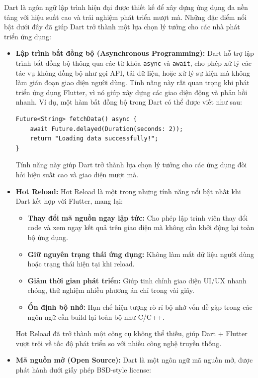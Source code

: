 \documentclass[../DoAn.tex]{subfiles}
\numberwithin{figure}{chapter}
\begin{document}
Dart là ngôn ngữ lập trình hiện đại được thiết kế để xây dựng ứng dụng đa nền tảng với hiệu suất cao và trải nghiệm phát triển mượt mà. Những đặc điểm nổi bật dưới đây đã giúp Dart trở thành một lựa chọn lý tưởng cho các nhà phát triển ứng dụng:

\begin{itemize}
\item \textbf{Lập trình bất đồng bộ (Asynchronous Programming):} 
Dart hỗ trợ lập trình bất đồng bộ thông qua các từ khóa \texttt{async} và \texttt{await}, cho phép xử lý các tác vụ không đồng bộ như gọi API, tải dữ liệu, hoặc xử lý sự kiện mà không làm gián đoạn giao diện người dùng. Tính năng này rất quan trọng khi phát triển ứng dụng Flutter, vì nó giúp xây dựng các giao diện động và phản hồi nhanh. Ví dụ, một hàm bất đồng bộ trong Dart có thể được viết như sau:
    
\begin{lstlisting}
Future<String> fetchData() async {
    await Future.delayed(Duration(seconds: 2));
    return "Loading data successfully!";
}
\end{lstlisting}
    
Tính năng này giúp Dart trở thành lựa chọn lý tưởng cho các ứng dụng đòi hỏi hiệu suất cao và giao diện mượt mà.

\item \textbf{Hot Reload:} 
Hot Reload là một trong những tính năng nổi bật nhất khi Dart kết hợp với Flutter, mang lại:

\begin{itemize}
    \item \textbf{Thay đổi mã nguồn ngay lập tức:} Cho phép lập trình viên thay đổi code và xem ngay kết quả trên giao diện mà không cần khởi động lại toàn bộ ứng dụng.
    \item \textbf{Giữ nguyên trạng thái ứng dụng:} Không làm mất dữ liệu người dùng hoặc trạng thái hiện tại khi reload.
    \item \textbf{Giảm thời gian phát triển:} Giúp tinh chỉnh giao diện UI/UX nhanh chóng, thử nghiệm nhiều phương án chỉ trong vài giây.
    \item \textbf{Ổn định bộ nhớ:} Hạn chế hiện tượng rò rỉ bộ nhớ vốn dễ gặp trong các ngôn ngữ cần build lại toàn bộ như C/C++.
\end{itemize}

Hot Reload đã trở thành một công cụ không thể thiếu, giúp Dart + Flutter vượt trội về tốc độ phát triển so với nhiều công nghệ truyền thống.

\item \textbf{Mã nguồn mở (Open Source):} 
Dart là một ngôn ngữ mã nguồn mở, được phát hành dưới giấy phép BSD-style license:


\end{itemize}
\end{document}
